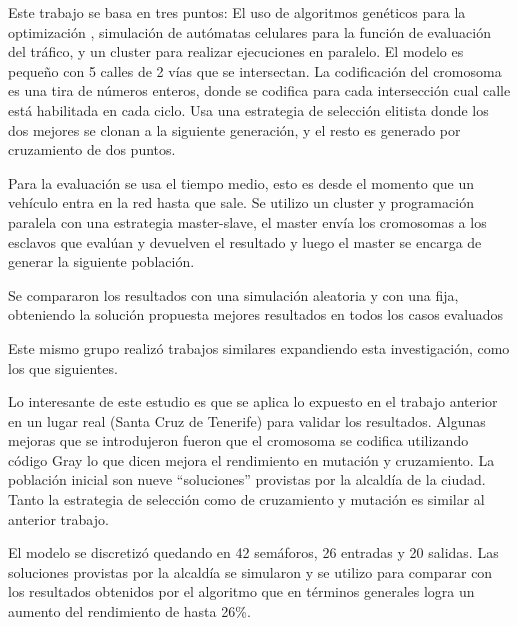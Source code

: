 \begin{itemize}
	\begin{item}
		
		Este trabajo se basa en tres puntos: El uso de algoritmos genéticos para la optimización , simulación de autómatas celulares para la función de evaluación del tráfico, y un cluster para realizar ejecuciones en paralelo.
		El modelo es pequeño con 5 calles de 2 vías que se intersectan.
		La codificación del cromosoma es una tira de números enteros, donde se codifica para cada intersección cual calle está habilitada en cada ciclo.
		Usa una estrategia de selección elitista donde los dos mejores se clonan a la siguiente generación, y el resto es generado por cruzamiento de dos puntos.
		
		Para la evaluación se usa el tiempo medio, esto es desde el momento que un vehículo entra en la red hasta que sale. Se utilizo un cluster y programación paralela con una estrategia master-slave, el master envía los cromosomas a los esclavos que evalúan y devuelven el resultado y luego el master se encarga de generar la siguiente población.
		
		Se compararon los resultados con una simulación aleatoria y con una fija, obteniendo la solución propuesta mejores resultados en todos los casos evaluados
		
		Este mismo grupo realizó trabajos similares expandiendo esta investigación, como los que siguientes.
	\end{item}

	\begin{item}
		\bibentry{Sanchez2008}
Lo interesante de este estudio es que se aplica lo expuesto en el trabajo anterior en un lugar real (Santa Cruz de Tenerife) para validar los resultados.
Algunas mejoras que se introdujeron fueron que el cromosoma se codifica utilizando código Gray lo que dicen mejora el rendimiento en mutación y cruzamiento. La población inicial son nueve “soluciones” provistas por la alcaldía de la ciudad. Tanto la estrategia de selección como de cruzamiento y mutación  es similar al anterior trabajo.

El modelo se discretizó quedando en 42 semáforos, 26 entradas y 20 salidas.
Las soluciones provistas por la alcaldía se simularon y se utilizo para comparar con los resultados obtenidos por el algoritmo que en términos generales logra un aumento del rendimiento de hasta 26\%.

	\end{item}


\end{itemize}
